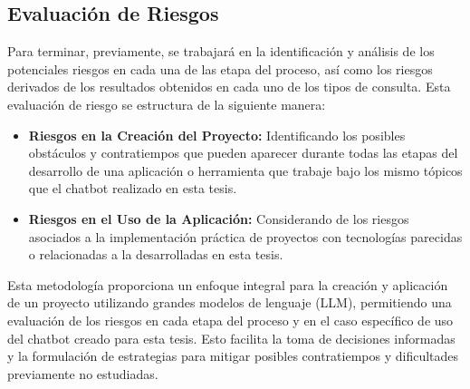 \subsection{Evaluación de Riesgos}

Para terminar, previamente, se trabajará en la identificación y análisis de los potenciales riesgos  en cada una de las etapa del proceso, así como los riesgos derivados de
los resultados obtenidos en cada uno de los tipos de consulta. Esta evaluación de riesgo se estructura de la siguiente manera:

\begin{itemize}
    \item \textbf{Riesgos en la Creación del Proyecto:} Identificando los posibles obstáculos y contratiempos que pueden aparecer durante todas las etapas del desarrollo de una aplicación o herramienta que trabaje bajo los mismo tópicos que el chatbot realizado en esta tesis.
    \item \textbf{Riesgos en el Uso de la Aplicación:} Considerando de los riesgos asociados a la implementación práctica de proyectos con tecnologías parecidas o relacionadas a la desarrolladas en esta tesis.
\end{itemize}

Esta metodología proporciona un enfoque integral para la creación y aplicación de un proyecto utilizando grandes modelos de lenguaje (LLM), permitiendo una evaluación de los riesgos en cada etapa del proceso y en el caso específico de uso del chatbot creado para esta tesis. Esto facilita la toma de decisiones informadas y la formulación de estrategias para mitigar posibles contratiempos y dificultades previamente no estudiadas.

